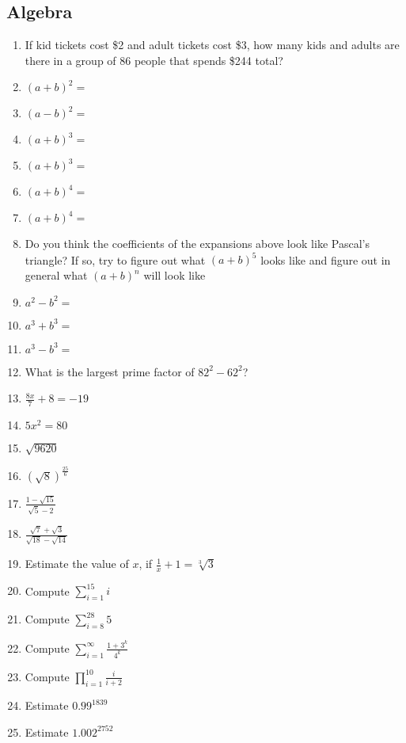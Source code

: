 	\subsection{Algebra}
		\begin{enumerate}
			\item If kid tickets cost \$2 and adult tickets cost \$3, how many kids and adults are there in a group of 86 people that spends \$244 total?
			\item $(a+b)^2 = $
			\item $(a-b)^2 = $
			\item $(a+b)^3 = $
			\item $(a+b)^3 = $
			\item $(a+b)^4 = $
			\item $(a+b)^4 = $
			\item Do you think the coefficients of the expansions above look like Pascal's triangle? If so, try to figure out what $(a+b)^5$ looks like and figure out in general what $(a+b)^n$ will look like
			\item $a^2-b^2 = $
			\item $a^3+b^3 = $
			\item $a^3-b^3 = $
			\item What is the largest prime factor of $82^{2}-62^{2}$?
			\item $\frac{8x}{7} + 8 = -19$
			\item $5x^{2} = 80$
			\item $\sqrt{9620}$
			\item $(\sqrt{8})^{\frac{25}{6}}$
			\item $\frac{1-\sqrt{15}}{\sqrt{5}-2}$ 
			\item $\frac{\sqrt{7}+\sqrt{3}}{\sqrt{18}-\sqrt{14}}$
			\item Estimate the value of $x$, if $\frac{1}{x} +1 = \sqrt[3]{3}$
			\item Compute $\sum\limits_{i=1}^{15} i$ \par
			\item Compute $\sum\limits_{i=8}^{28} 5$ \par
			\item Compute $\sum\limits_{i=1}^{\infty} \frac{1+3^{k}}{4^{k}}$ \par
			\item Compute $\prod\limits_{i=1}^{10} \frac{i}{i+2}$
			\item Estimate $0.99^{1839}$
			\item Estimate $1.002^{2752}$

		\end{enumerate}
